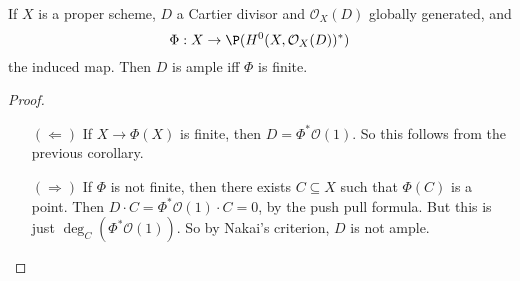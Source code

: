 \documentclass[a4paper]{article}
\begin{document}
\begin{cor}
  If $X$ is a proper scheme, $D$ a Cartier divisor and $\mathcal{O}_X(D)$ globally generated, and
  \[
    \Phi: X \to \P(H^0(X, \mathcal{O}_X(D))^*)
  \]
  the induced map. Then $D$ is ample iff $\Phi$ is finite.
\end{cor}

\begin{proof}\leavevmode
  \begin{enumerate}
    \item[$(\Leftarrow)$] If $X \to \Phi(X)$ is finite, then $D = \Phi^* \mathcal{O}(1)$. So this follows from the previous corollary.
    \item[$(\Rightarrow)$] If $\Phi$ is not finite, then there exists $C \subseteq X$ such that $\Phi(C)$ is a point. Then $D \cdot C = \Phi^* \mathcal{O}(1) \cdot C = 0$, by the push pull formula. But this is just $\deg_C (\Phi^* \mathcal{O}(1))$. So by Nakai's criterion, $D$ is not ample.\qedhere
  \end{enumerate}
\end{proof}
\end{document}
